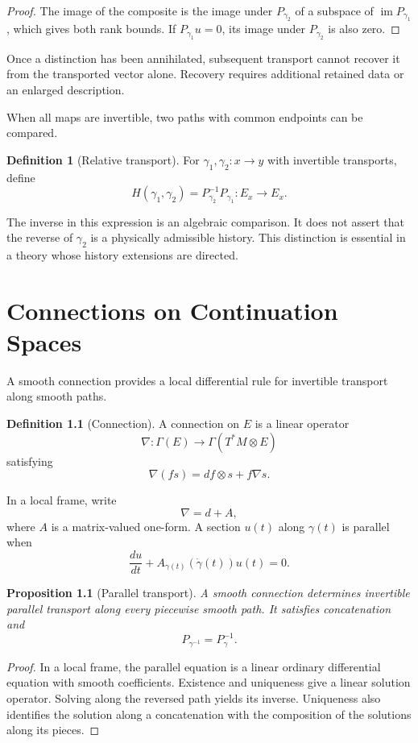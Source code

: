 \documentclass[11pt,oneside]{book}
\newtheorem{proposition}[theorem]{Proposition}
\theoremstyle{definition}
\newtheorem{definition}[theorem]{Definition}
\theoremstyle{remark}
\begin{document}
\begin{proof}
The image of the composite is the image under $P_{\gamma_2}$
of a subspace of $\operatorname{im}P_{\gamma_1}$, which gives
both rank bounds. If $P_{\gamma_1}u=0$, its image under
$P_{\gamma_2}$ is also zero.
\end{proof}

Once a distinction has been annihilated, subsequent transport
cannot recover it from the transported vector alone. Recovery
requires additional retained data or an enlarged description.

When all maps are invertible, two paths with common endpoints
can be compared.

\begin{definition}[Relative transport]
For $\gamma_1,\gamma_2:x\to y$ with invertible transports, define
\[
H(\gamma_1,\gamma_2)
=P_{\gamma_2}^{-1}P_{\gamma_1}:E_x\to E_x.
\]
\end{definition}

The inverse in this expression is an algebraic comparison.
It does not assert that the reverse of $\gamma_2$ is a physically
admissible history. This distinction is essential in a theory whose
history extensions are directed.


\chapter{Connections on Continuation Spaces}

A smooth connection provides a local differential rule for
invertible transport along smooth paths.

\begin{definition}[Connection]
A connection on $E$ is a linear operator
\[
\nabla:\Gamma(E)\longrightarrow
\Gamma(T^*M\otimes E)
\]
satisfying
\[
\nabla(fs)=df\otimes s+f\nabla s.
\]
\end{definition}

In a local frame, write
\[
\nabla=d+A,
\]
where $A$ is a matrix-valued one-form. A section $u(t)$ along
$\gamma(t)$ is parallel when
\[
\frac{du}{dt}
+
A_{\gamma(t)}(\dot\gamma(t))u(t)=0.
\]

\begin{proposition}[Parallel transport]
A smooth connection determines invertible parallel transport
along every piecewise smooth path. It satisfies concatenation and
\[
P_{\gamma^{-1}}=P_\gamma^{-1}.
\]
\end{proposition}

\begin{proof}
In a local frame, the parallel equation is a linear ordinary
differential equation with smooth coefficients. Existence and
uniqueness give a linear solution operator. Solving along the
reversed path yields its inverse. Uniqueness also identifies the
solution along a concatenation with the composition of the
solutions along its pieces.
\end{proof}
\end{document}
